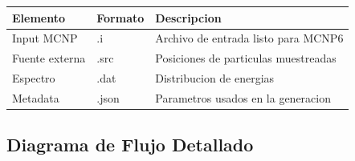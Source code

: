 \documentclass[12pt,a4paper]{article}
\begin{document}
\begin{center}
\begin{tabular}{lll}
\toprule
\textbf{Elemento} & \textbf{Formato} & \textbf{Descripcion} \\
\midrule
Input MCNP & .i & Archivo de entrada listo para MCNP6 \\
Fuente externa & .src & Posiciones de particulas muestreadas \\
Espectro & .dat & Distribucion de energias \\
Metadata & .json & Parametros usados en la generacion \\
\bottomrule
\end{tabular}
\end{center}

\subsection{Diagrama de Flujo Detallado}
\end{document}
